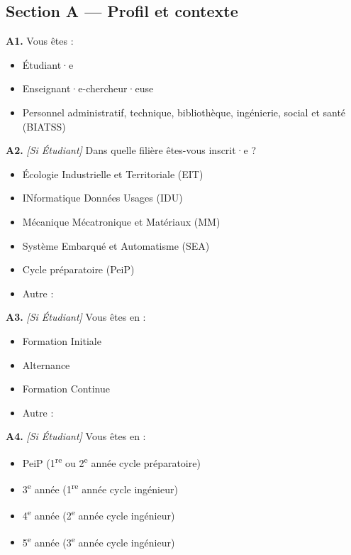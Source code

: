 \bigskip

\subsection{Section A — Profil et contexte}

\textbf{A1.} Vous êtes :
\begin{itemize}[label=$\square$, leftmargin=1.5cm]
  \item Étudiant·e
  \item Enseignant·e-chercheur·euse
  \item Personnel administratif, technique, bibliothèque, ingénierie, social et santé (BIATSS)
\end{itemize}

\textbf{A2.} \textit{[Si Étudiant]} Dans quelle filière êtes-vous inscrit·e ?
\begin{itemize}[label=$\square$, leftmargin=1.5cm]
  \item Écologie Industrielle et Territoriale (EIT)
  \item INformatique Données Usages (IDU)
  \item Mécanique Mécatronique et Matériaux (MM)
  \item Système Embarqué et Automatisme (SEA)
  \item Cycle préparatoire (PeiP)
  \item Autre : \underline{\hspace{4cm}}
\end{itemize}

\textbf{A3.} \textit{[Si Étudiant]} Vous êtes en :
\begin{itemize}[label=$\square$, leftmargin=1.5cm]
  \item Formation Initiale
  \item Alternance
  \item Formation Continue
  \item Autre : \underline{\hspace{4cm}}
\end{itemize}

\textbf{A4.} \textit{[Si Étudiant]} Vous êtes en :
\begin{itemize}[label=$\square$, leftmargin=1.5cm]
  \item PeiP (1\textsuperscript{re} ou 2\textsuperscript{e} année cycle préparatoire)
  \item 3\textsuperscript{e} année (1\textsuperscript{re} année cycle ingénieur)
  \item 4\textsuperscript{e} année (2\textsuperscript{e} année cycle ingénieur)
  \item 5\textsuperscript{e} année (3\textsuperscript{e} année cycle ingénieur)
\end{itemize}


